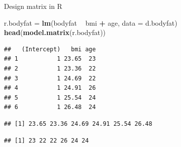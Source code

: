 \documentclass[10pt,ignorenonframetext,]{beamer}
\newenvironment{Shaded}{\begin{snugshade}}{\end{snugshade}}
\newcommand{\KeywordTok}[1]{\textcolor[rgb]{0.13,0.29,0.53}{\textbf{#1}}}
\newcommand{\DataTypeTok}[1]{\textcolor[rgb]{0.13,0.29,0.53}{#1}}
\newcommand{\StringTok}[1]{\textcolor[rgb]{0.31,0.60,0.02}{#1}}
\newcommand{\OperatorTok}[1]{\textcolor[rgb]{0.81,0.36,0.00}{\textbf{#1}}}
\newcommand{\NormalTok}[1]{#1}
\begin{document}
\begin{frame}[fragile]

\begin{block}{Design matrix in R}

\small

\begin{Shaded}
\begin{Highlighting}[]
\NormalTok{r.bodyfat =}\StringTok{ }\KeywordTok{lm}\NormalTok{(bodyfat }\OperatorTok{~}\StringTok{ }\NormalTok{bmi }\OperatorTok{+}\StringTok{ }\NormalTok{age, }\DataTypeTok{data =}\NormalTok{ d.bodyfat)}
\KeywordTok{head}\NormalTok{(}\KeywordTok{model.matrix}\NormalTok{(r.bodyfat))}
\end{Highlighting}
\end{Shaded}

\begin{verbatim}
##   (Intercept)   bmi age
## 1           1 23.65  23
## 2           1 23.36  22
## 3           1 24.69  22
## 4           1 24.91  26
## 5           1 25.54  24
## 6           1 26.48  24
\end{verbatim}

\begin{Shaded}
\end{Shaded}

\begin{verbatim}
## [1] 23.65 23.36 24.69 24.91 25.54 26.48
\end{verbatim}

\begin{Shaded}
\end{Shaded}

\begin{verbatim}
## [1] 23 22 22 26 24 24
\end{verbatim}

\normalsize

\end{block}

\end{frame}
\end{document}
